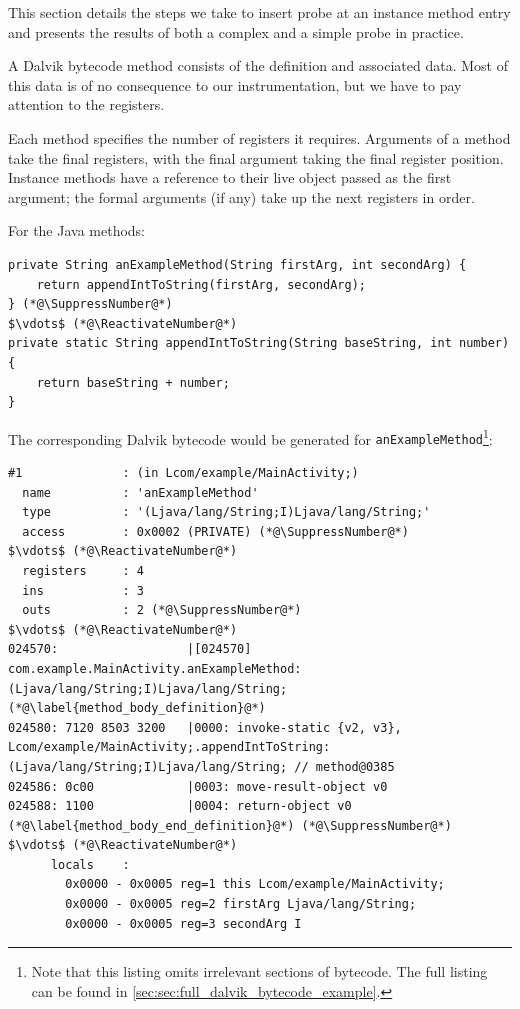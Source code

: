 This section details the steps we take to insert probe at an instance method
entry and presents the results of both a complex and a simple probe in practice.

A Dalvik bytecode method consists of the definition and associated data. Most of
this data is of no consequence to our instrumentation, but we have to pay
attention to the registers.

Each method specifies the number of registers it requires. Arguments of a method
take the final registers, with the final argument taking the final register
position. Instance methods have a reference to their live object passed as the
first argument; the formal arguments (if any) take up the next registers in
order.

For the Java methods:

\begin{lstlisting}[mathescape, numberblanklines=false]
private String anExampleMethod(String firstArg, int secondArg) {
    return appendIntToString(firstArg, secondArg);
} (*@\SuppressNumber@*)
$\vdots$ (*@\ReactivateNumber@*)
private static String appendIntToString(String baseString, int number) {
    return baseString + number;
}
\end{lstlisting}

The corresponding Dalvik bytecode would be generated for {\tt anExampleMethod}\footnote{Note that this listing omits irrelevant
sections of bytecode. The full listing can be found in
\autoref{sec:sec:full_dalvik_bytecode_example}.}:

\begin{lstlisting}[mathescape,numberblanklines=false]
#1              : (in Lcom/example/MainActivity;)
  name          : 'anExampleMethod'
  type          : '(Ljava/lang/String;I)Ljava/lang/String;'
  access        : 0x0002 (PRIVATE) (*@\SuppressNumber@*)
$\vdots$ (*@\ReactivateNumber@*)
  registers     : 4
  ins           : 3
  outs          : 2 (*@\SuppressNumber@*)
$\vdots$ (*@\ReactivateNumber@*)
024570:                  |[024570] com.example.MainActivity.anExampleMethod:(Ljava/lang/String;I)Ljava/lang/String; (*@\label{method_body_definition}@*)
024580: 7120 8503 3200   |0000: invoke-static {v2, v3}, Lcom/example/MainActivity;.appendIntToString:(Ljava/lang/String;I)Ljava/lang/String; // method@0385
024586: 0c00             |0003: move-result-object v0
024588: 1100             |0004: return-object v0 (*@\label{method_body_end_definition}@*) (*@\SuppressNumber@*)
$\vdots$ (*@\ReactivateNumber@*)
      locals    :
        0x0000 - 0x0005 reg=1 this Lcom/example/MainActivity;
        0x0000 - 0x0005 reg=2 firstArg Ljava/lang/String;
        0x0000 - 0x0005 reg=3 secondArg I
\end{lstlisting}

